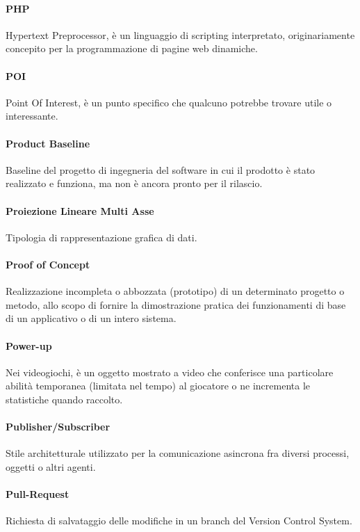 \documentclass[]{article}
\begin{document}
	\paragraph*{PHP}
	Hypertext Preprocessor, è un linguaggio di scripting interpretato, originariamente concepito per la programmazione di pagine web dinamiche.

	\paragraph*{POI}
	Point Of Interest, è un punto specifico che qualcuno potrebbe trovare utile o interessante.

	\paragraph*{Product Baseline}
	Baseline del progetto di ingegneria del software in cui il prodotto è stato realizzato e funziona, ma non è ancora pronto per il rilascio.

	\paragraph*{Proiezione Lineare Multi Asse}
	Tipologia di rappresentazione grafica di dati.
	
	\paragraph*{Proof of Concept}
	Realizzazione incompleta o abbozzata (prototipo) di un determinato progetto o metodo, allo scopo di fornire la dimostrazione pratica dei funzionamenti di base di un applicativo o di un intero sistema.

	\paragraph*{Power-up}
	Nei videogiochi, è un oggetto mostrato a video che conferisce una particolare abilità temporanea (limitata nel tempo) al giocatore o ne incrementa le statistiche quando raccolto.

	\paragraph*{Publisher/Subscriber}
	Stile architetturale utilizzato per la comunicazione asincrona fra diversi processi, oggetti o altri agenti.

	\paragraph*{Pull-Request}
	Richiesta di salvataggio delle modifiche in un branch del Version Control System.
\end{document}
